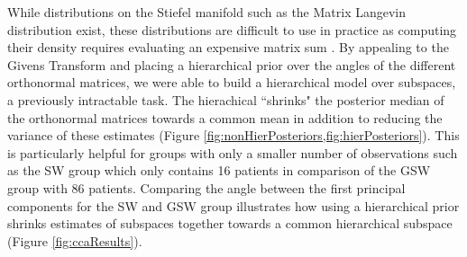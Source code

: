 \documentclass{article}
\begin{document}
While distributions on the Stiefel manifold such as the Matrix Langevin distribution \citep{muirhead2009aspects} exist, these distributions are difficult to use in practice as computing their density requires evaluating an expensive matrix sum \citep{hoff2009simulation}. By appealing to the Givens Transform and placing a hierarchical prior over the angles of the different orthonormal matrices, we were able to build a hierarchical model over subspaces, a previously intractable task. The hierachical ``shrinks" the posterior median of the orthonormal matrices towards a common mean in addition to reducing the variance of these estimates (Figure \ref{fig:nonHierPosteriors,fig:hierPosteriors}). This is particularly helpful for groups with only a smaller number of observations such as the SW group which only contains 16 patients in comparison of the GSW group with 86 patients. Comparing the angle between the first principal components for the SW and GSW group illustrates how using a hierarchical prior shrinks estimates of subspaces together towards a common hierarchical subspace (Figure \ref{fig:ccaResults}).
\end{document}
